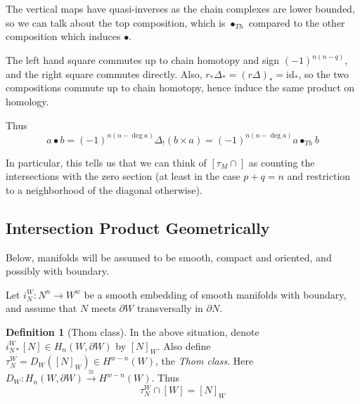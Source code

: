 \documentclass[reqno]{amsart}
\theoremstyle{definition}
\newtheorem{definition}[theorem]{Definition}
\theoremstyle{remark}
\newcommand{\id}{{\mathrm{id}}}
\begin{document}
    The vertical maps have quasi-inverses as the chain complexes are
    lower bounded, so we can talk about the top composition, which
    is $\bullet_{Th}$ compared to the other composition which
    induces $\bullet$.
    
    The left hand square commutes up to
    chain homotopy and sign 
    $(-1)^{n(n-q)}$, and the right square commutes directly.
    Also, $r_* \Delta_* = (r \Delta)_* = \id_*$, so
    the two compositions commute up to chain homotopy, hence
    induce the same product on homology.
    
    Thus
    \[
    a \bullet b = 
    (-1)^{n (n - \deg a)} \Delta_! (b \times a)
    = (-1)^{n (n - \deg a)} a \bullet_{Th} b
    \] 

    In particular, this tells us that we can think of
    $\left[ \tau_M \cap \right] $ as counting the intersections
    with the zero section (at least in the case $p+q=n$ and
    restriction to a neighborhood of the diagonal
    otherwise).
    \todo{}





    \newpage







      \subsection{Intersection Product Geometrically}

      Below, manifolds will be assumed to be
      smooth, compact and oriented, and possibly with boundary.

      Let $i_{N}^{W} \colon N^{n} \to W^{w}$ be a smooth
      embedding of smooth manifolds with boundary, and assume
      that $N$ meets $\partial W$ transversally in $\partial N$.

      \begin{definition}[Thom class]
          In the above situation, denote
          $i_{N*}^{W} \left[ N \right] \in 
          H_n (W, \partial W)$ by $\left[ N \right]_W$. Also
          define $\tau_N^{W} = 
          D_W \left( \left[ N \right]_W \right) 
          \in H^{w-n}(W)$, the \textit{Thom class}.
          Here $D_W \colon H_n(W, \partial W) 
          \stackrel{\cong}{\to} H^{w-n}(W)$.
          Thus
          \[
          \tau_N^{W} \cap \left[ W \right] =
          \left[ N \right]_W
          \] 
      \end{definition}
\end{document}
